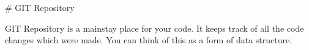 # GIT Repository

GIT Repository is a mainstay place for your code. It keeps track of all the code changes which were made. You can think of this as a form of data structure.
